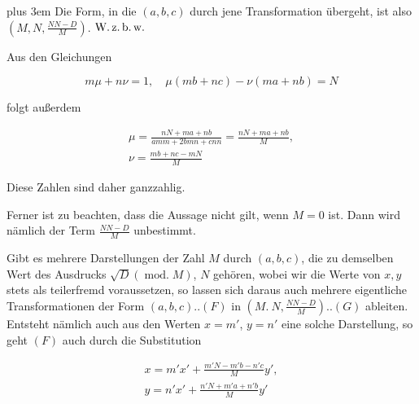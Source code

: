 \begingroup\rightskip=0pt plus 3em\relax
Die Form, in die $(a,b,c)$ durch jene Transformation übergeht, ist also $(M,N,\frac{NN-D}{M})$. $\text{W.\,z.\,b.\,w.}$
\par\endgroup

Aus den Gleichungen

\[
m\mu+n\nu=1,\quad \mu(mb+nc)-\nu(ma+nb)=N
\]

folgt außerdem

\[
\begin{gathered}\mu=\frac{nN+ma+nb}{amm+2bmn+cnn}=\frac{nN+ma+nb}{M},\\\nu=\frac{mb+nc-mN}{M}\end{gathered}
\]

Diese Zahlen sind daher ganzzahlig.

Ferner ist zu beachten, dass die Aussage nicht gilt, wenn $M=0$ ist. Dann wird nämlich der Term $\frac{NN-D}{M}$ unbestimmt.


Gibt es mehrere Darstellungen der Zahl $M$ durch $(a,b,c)$, die zu demselben Wert des Ausdrucks $\surd D(\operatorname{mod.}M)$, $N$ gehören, wobei wir die Werte von $x,y$ stets als teilerfremd voraussetzen, so lassen sich daraus auch mehrere eigentliche Transformationen der Form $(a,b,c)..(F)$ in $(M.\ N,\frac{NN-D}{M})..(G)$ ableiten. Entsteht nämlich auch aus den Werten $x=m'$, $y=n'$ eine solche Darstellung, so geht $(F)$ auch durch die Substitution


\[
\begin{gathered}x=m'x'+\frac{m'N-m'b-n'c}{M}y',\\y=n'x'+\frac{n'N+m'a+n'b}{M}y'\end{gathered}
\]


